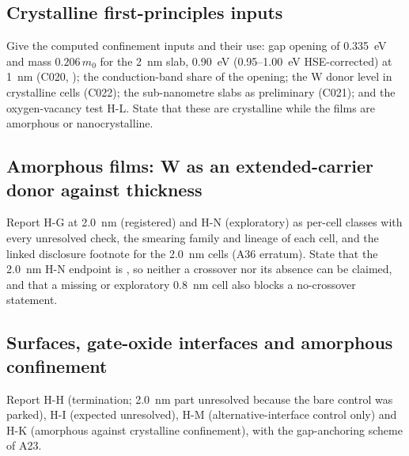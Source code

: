 \documentclass[11pt]{article}
\begin{document}
\subsection{Crystalline first-principles inputs}
\label{sec:r-crystal}
\begin{pdIntent}
Give the computed confinement inputs and their use: gap opening of \SI{0.335}{eV} and mass $0.206\,m_0$ for the
\SI{2}{nm} slab, \SI{0.90}{eV} (\SI{0.95}{}--\SI{1.00}{eV} HSE-corrected) at \SI{1}{nm} (C020, ); the
conduction-band share of the opening; the W donor level in crystalline cells (C022); the sub-nanometre slabs as
preliminary (C021); and the oxygen-vacancy test H-L. State that these are crystalline while the films are amorphous or
nanocrystalline. %
\end{pdIntent}

\subsection{Amorphous films: W as an extended-carrier donor against thickness}
\label{sec:r-hn}
\begin{pdIntent}
Report H-G at \SI{2.0}{nm} (registered) and H-N (exploratory) as per-cell classes with every unresolved check, the
smearing family and lineage of each cell, and the linked disclosure footnote for the \SI{2.0}{nm} cells (A36 erratum).
State that the \SI{2.0}{nm} H-N endpoint is , so neither a crossover nor its absence can be claimed,
and that a missing or exploratory \SI{0.8}{nm} cell also blocks a no-crossover statement. %
\end{pdIntent}

\subsection{Surfaces, gate-oxide interfaces and amorphous confinement}
\label{sec:r-interfaces}
\begin{pdIntent}
Report H-H (termination; \SI{2.0}{nm} part unresolved because the bare control was parked), H-I (expected
unresolved), H-M (alternative-interface control only) and H-K (amorphous against crystalline confinement), with the
gap-anchoring scheme of A23. %
\end{pdIntent}
\end{document}

